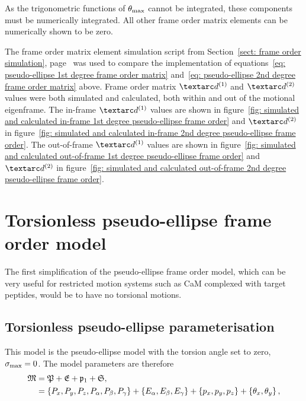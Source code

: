 As the trigonometric functions of $\theta_\textrm{max}$ cannot be integrated, these components must be numerically integrated.
All other frame order matrix elements can be numerically shown to be zero.



The frame order matrix element simulation script from Section~\ref{sect: frame order simulation}, page~\pageref{sect: frame order simulation} was used to compare the implementation of equations~\ref{eq: pseudo-ellipse 1st degree frame order matrix} and~\ref{eq: pseudo-ellipse 2nd degree frame order matrix} above.
Frame order matrix $\FOone$ and $\FOtwo$ values were both simulated and calculated, both within and out of the motional eigenframe.
The in-frame $\FOone$ values are shown in figure~\ref{fig: simulated and calculated in-frame 1st degree pseudo-ellipse frame order} and $\FOtwo$ in figure~\ref{fig: simulated and calculated in-frame 2nd degree pseudo-ellipse frame order}.
The out-of-frame $\FOone$ values are shown in figure~\ref{fig: simulated and calculated out-of-frame 1st degree pseudo-ellipse frame order} and $\FOtwo$ in figure~\ref{fig: simulated and calculated out-of-frame 2nd degree pseudo-ellipse frame order}.



\section{Torsionless pseudo-ellipse frame order model}

The first simplification of the pseudo-ellipse frame order model, which can be very useful for restricted motion systems such as CaM complexed with target peptides, would be to have no torsional motions.


\subsection{Torsionless pseudo-ellipse parameterisation}

This model is the pseudo-ellipse model with the torsion angle set to zero, $\sigma_\textrm{max} = 0$.
The model parameters are therefore
\begin{subequations}
\begin{align}
    \mathfrak{M} &= \mathfrak{P} + \mathfrak{E} + \mathfrak{p}_1 + \mathfrak{S}, \\
              &= \left\{ P_x, P_y, P_z, P_\alpha, P_\beta, P_\gamma \right\} + \left\{ E_\alpha, E_\beta, E_\gamma \right\} + \left\{ p_x, p_y, p_z \right\} + \left\{ \theta_x, \theta_y \right\} ,
\end{align}
\end{subequations}

